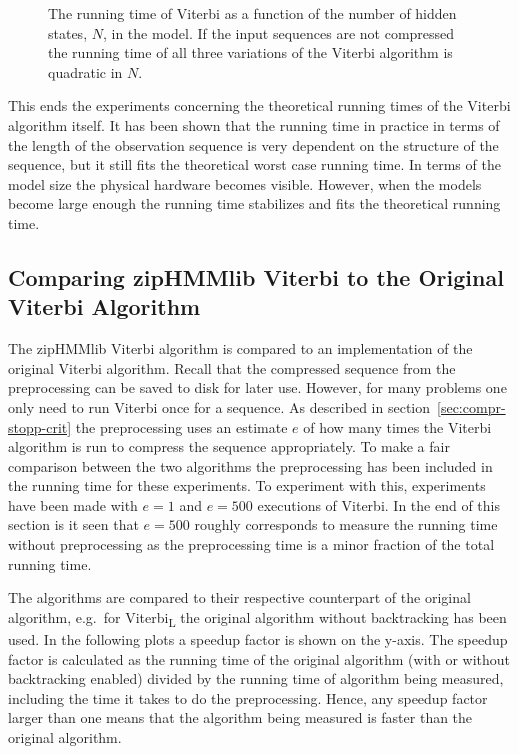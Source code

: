 \begin{figure}
  \centering
  
  \caption{The running time of Viterbi as a function of the number of hidden
    states, $N$, in the model. If the input sequences are not compressed the
    running time of all three variations of the Viterbi algorithm is quadratic
    in $N$.}
  \label{fig:assymptotic_viterbi_N}
\end{figure}

This ends the experiments concerning the theoretical running times of the
Viterbi algorithm itself. It has been shown that the running time in practice
in terms of the length of the observation sequence is very dependent on the
structure of the sequence, but it still fits the theoretical worst case running time. In
terms of the model size the physical hardware becomes visible. However, when
the models become large enough the running time stabilizes and fits the theoretical
running time.

\subsection{Comparing zipHMMlib Viterbi to the Original Viterbi Algorithm}
\label{sec:comp-ziphmml-viterbi}

The zipHMMlib Viterbi algorithm is compared to an implementation of the
original Viterbi algorithm. Recall that the compressed sequence from the
preprocessing can be saved to disk for later use. However, for many problems
one only need to run Viterbi once for a sequence. As described in
section~\ref{sec:compr-stopp-crit} the preprocessing uses an estimate $e$ of
how many times the Viterbi algorithm is run to compress the sequence
appropriately. To make a fair comparison between the two algorithms the
preprocessing has been included in the running time for these experiments. To
experiment with this, experiments have been made with $e = 1$ and $e = 500$
executions of Viterbi. In the end of this section is it seen that $e = 500$
roughly corresponds to measure the running time without preprocessing as the
preprocessing time is a minor fraction of the total running time.

The algorithms are compared to their respective counterpart of the original
algorithm, e.g.\ for Viterbi\textsubscript{L} the original
algorithm without backtracking has been used. In the following plots a
speedup factor is shown on the y-axis. The speedup factor is calculated as
the running time of the original algorithm (with or without backtracking
enabled) divided by the running time of algorithm being measured, including the
time it takes to do the preprocessing. Hence, any speedup factor larger than one
means that the algorithm being measured is faster than the original algorithm.

